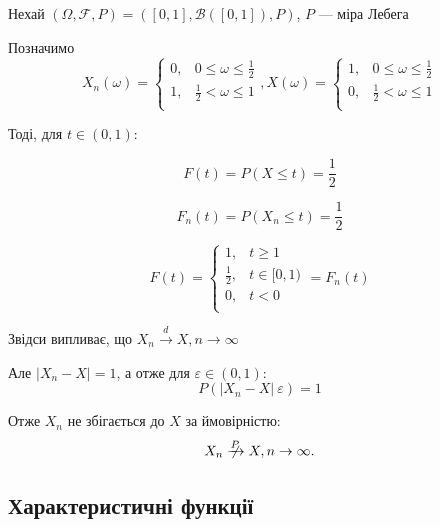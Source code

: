 \begin{example}
    Нехай $(\Omega, \mathcal{F}, P) = ([0, 1], \mathcal{B}([0, 1]), P)$,
    $P$ --- міра Лебега

    Позначимо
    $$X_n(\omega) = \left\{ \begin{array}{ll}
        0, & 0 \leqslant \omega \leqslant \frac{1}{2} \\
        1, & \frac{1}{2} < \omega \leqslant 1 \\
    \end{array} \right.,
    X(\omega) = \left\{ \begin{array}{ll}
        1, & 0 \leqslant \omega \leqslant \frac{1}{2} \\
        0, & \frac{1}{2} < \omega \leqslant 1 \\
    \end{array} \right.$$

    \beautifulImage
    \beautifulImage

    Тоді, для $t \in (0, 1)$:
    
    $$F(t) = P(X \leqslant t) = \frac{1}{2}$$

    $$F_n(t) = P(X_n \leqslant t) = \frac{1}{2}$$

    $$F(t) = \left\{ \begin{array}{ll}
        1, & t \geqslant 1 \\
        \frac{1}{2}, & t \in [0, 1) \\
        0, & t < 0 \\
    \end{array} \right. = F_n(t)$$

    Звідси випливає, що $X_n \xrightarrow{d} X, n \rightarrow \infty$

    Але $|X_n - X| = 1$, а отже для $\varepsilon \in (0, 1)$:
    $$P(|X_n - X| \> \varepsilon) = 1$$

    Отже $X_n$ не збігається до $X$ за ймовірністю:
    $$X_n \centernot{\xrightarrow{P}} X, n \rightarrow \infty.$$
\end{example}


\subsection{Характеристичні функції}

